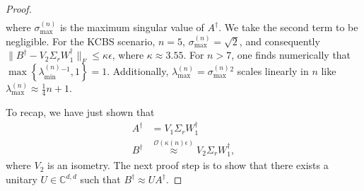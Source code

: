 \begin{proof}
\begin{align*}
\end{align*}
where $\sigma_{\text{max}}^{(n)}$ is the maximum singular value of $A^{\dag}$. We take the second term to be negligible. For the KCBS scenario, $n=5$, $\sigma_{\text{max}}^{(n)}=\sqrt{2}$, and consequently $\|B^{\dag}-V_2\Sigma_r W_1^{\dag}\|_F\leq \kappa\epsilon$, where $\kappa \approx 3.55$. 
For $n>7$, one finds numerically that $\operatorname{max}\left\{\lambda_{\text{min}}^{(n)}{}^{-1},1\right\}=1$. Additionally, $\lambda_{\text{max}}^{(n)}=\sigma_{\text{max}}^{(n)}{}^2$ scales linearly in $n$ like $\lambda_{\text{max}}^{(n)}\approx \frac{1}{4}n+1$.

To recap, we have just shown that
\begin{align*}
A^{\dag} & =V_1\Sigma_r W_1^{\dag} \\[0.3em]
B^{\dag} & \stackrel{\mathcal{O}(\kappa(n)\epsilon)}{\approx} V_2\Sigma_r W_1^{\dag},
\end{align*}
where $V_2$ is an isometry. The next proof step is to show that there exists a unitary $U\in\mathbb{C}^{d,d}$ such that $B^{\dag}\approx U A^{\dag}$.


\end{proof}
